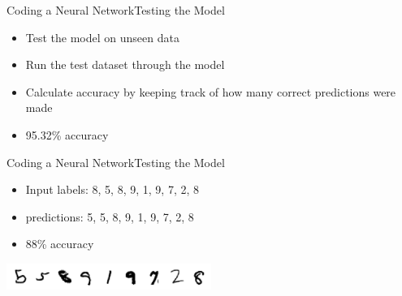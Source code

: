 \documentclass{beamer}
\begin{document}

\begin{frame}{Coding a Neural Network}{Testing the Model}
    \begin{itemize}
        \item Test the model on unseen data
        \item Run the test dataset through the model
        \item Calculate accuracy by keeping track of how many correct predictions were made
        \item 95.32\% accuracy
    \end{itemize}
\end{frame}

\begin{frame}{Coding a Neural Network}{Testing the Model}
    \begin{multicols}{2} 
        \begin{itemize}
            \item Input labels: 8, 5, 8, 9, 1, 9, 7, 2, 8
            \item predictions: 5, 5, 8, 9, 1, 9, 7, 2, 8
            \item 88\% accuracy
        \end{itemize}
        \begin{center}
            \includegraphics[width=0.5\textwidth]{images/sample_predictions.png}
        \end{center}
    \end{multicols}
\end{frame}
\end{document}
